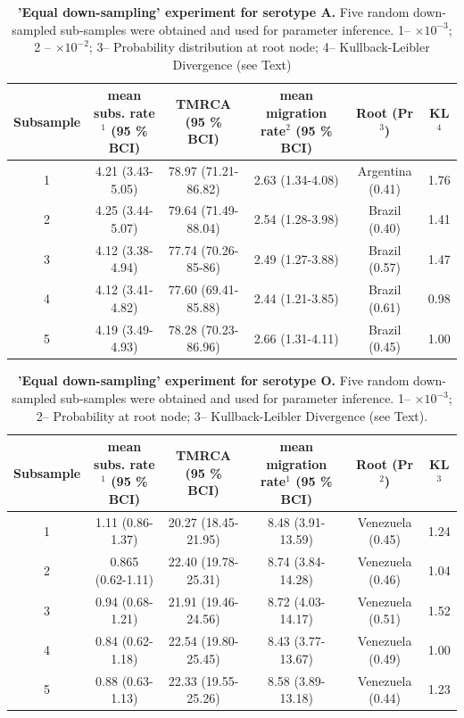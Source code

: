\documentclass[a4paper,10pt]{article}
\begin{document}
\newpage
\begin{table}
\medskip
\begin{minipage}{\textwidth} 
\begin{center}
\caption{ {{\bf 'Equal down-sampling' experiment for serotype A.}} 
Five random down-sampled sub-samples were obtained and used for parameter inference.
1-- $\times 10^{-3}$; 2 -- $\times 10^{-2}$; 3-- Probability distribution at root node; 4-- Kullback-Leibler Divergence (see Text) }
\begin{tabular}{cccccc}
\toprule
Subsample	&mean subs. rate$^{1}$ (95 \% BCI)	&TMRCA (95 \% BCI)	&mean migration rate$^{2}$  (95 \% BCI)	&Root (Pr$^{3}$)& KL$^4$\\
\midrule
1	&4.21 (3.43-5.05)	&78.97 (71.21-86.82)	&2.63 (1.34-4.08)	&Argentina (0.41)& 1.76\\
2	&4.25 (3.44-5.07)	&79.64 (71.49-88.04)	&2.54 (1.28-3.98)	&Brazil (0.40)& 1.41\\
3	&4.12 (3.38-4.94)	&77.74 (70.26-85-86)	&2.49 (1.27-3.88)	&Brazil (0.57)&1.47\\
4	&4.12 (3.41-4.82)	&77.60 (69.41-85.88)	&2.44 (1.21-3.85)	&Brazil (0.61)&0.98\\
5	&4.19 (3.49-4.93)	&78.28 (70.23-86.96)	&2.66 (1.31-4.11)	&Brazil (0.45)& 1.00\\
\bottomrule
\end{tabular}
\label{stab:ED_A}
\end{center}
\end{minipage}
\end{table}

\newpage
\begin{table}
\medskip
\begin{minipage}{\textwidth}
\begin{center}
 \caption{ {{\bf 'Equal down-sampling' experiment for serotype O.}} Five random down-sampled sub-samples were obtained and used for parameter inference.
1-- $\times 10^{-3}$; 2--  Probability at root node; 3-- Kullback-Leibler Divergence (see Text).}
\begin{tabular}{cccccc}
\toprule
Subsample	&mean subs. rate$^{1}$ (95 \% BCI)	&TMRCA (95 \% BCI)	&mean migration rate$^{1}$ (95 \% BCI)	&Root (Pr$^{2}$) & KL$^3$\\
\midrule
1	&1.11 (0.86-1.37)	&20.27 (18.45-21.95)	&8.48 (3.91-13.59)	&Venezuela  (0.45)& 1.24\\
2	&0.865 (0.62-1.11)	&22.40 (19.78-25.31)	&8.74 (3.84-14.28)	&Venezuela  (0.46)&1.04\\
3	&0.94 (0.68-1.21)	&21.91 (19.46-24.56)	&8.72 (4.03-14.17)	&Venezuela  (0.51)&1.52\\
4	&0.84 (0.62-1.18)	&22.54 (19.80-25.45)	&8.43 (3.77-13.67)	&Venezuela  (0.49)&1.00\\
5	&0.88 (0.63-1.13)	&22.33 (19.55-25.26)	&8.58 (3.89-13.18)	&Venezuela  (0.44)&1.23\\

\bottomrule
\end{tabular}
\label{stab:ED_O}
\end{center}
\end{minipage}
\end{table}
\end{document}
